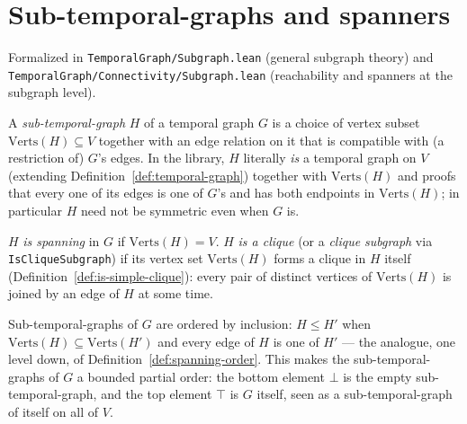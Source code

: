 \chapter{Sub-temporal-graphs and spanners}
\label{chap:spanners}

Formalized in \texttt{TemporalGraph/Subgraph.lean} (general subgraph theory)
and \texttt{TemporalGraph/Connectivity/Subgraph.lean} (reachability and
spanners at the subgraph level).

\begin{definition}
  \label{def:sub-temporal-graph}
  \leanok
  A \emph{sub-temporal-graph} $H$ of a temporal graph $G$ is a choice of
  vertex subset $\mathrm{Verts}(H) \subseteq V$ together with an edge
  relation on it that is compatible with (a restriction of) $G$'s edges. In
  the library, $H$ literally \emph{is} a temporal graph on $V$ (extending
  Definition~\ref{def:temporal-graph}) together with $\mathrm{Verts}(H)$ and
  proofs that every one of its edges is one of $G$'s and has both endpoints
  in $\mathrm{Verts}(H)$; in particular $H$ need not be symmetric even when
  $G$ is.
\end{definition}

\begin{definition}
  \label{def:sub-spanning-clique}
  \leanok
  $H$ \emph{is spanning} in $G$ if $\mathrm{Verts}(H) = V$. $H$ \emph{is a
  clique} (or a \emph{clique subgraph} via \texttt{IsCliqueSubgraph}) if its vertex set $\mathrm{Verts}(H)$ forms a clique in $H$ itself
  (Definition~\ref{def:is-simple-clique}): every pair of distinct vertices of
  $\mathrm{Verts}(H)$ is joined by an edge of $H$ at some time.
\end{definition}

\begin{definition}
  \label{def:subgraph-order}
  \leanok
  Sub-temporal-graphs of $G$ are ordered by inclusion: $H \le H'$ when
  $\mathrm{Verts}(H) \subseteq \mathrm{Verts}(H')$ and every edge of $H$ is
  one of $H'$ — the analogue, one level down, of
  Definition~\ref{def:spanning-order}. This makes the sub-temporal-graphs of
  $G$ a bounded partial order: the bottom element $\bot$ is the empty
  sub-temporal-graph, and the top element $\top$ is $G$ itself, seen as a
  sub-temporal-graph of itself on all of $V$.
\end{definition}

